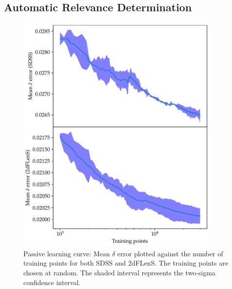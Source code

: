 \documentclass[11pt,twoside]{report}
\begin{document}
\subsection{Automatic Relevance Determination}
  \begin{figure}
    \centering
    \includegraphics[width=0.9\textwidth]{passive_delta.pdf}
    \caption{Passive learning curve: Mean $\delta$ error plotted against the number of training points for both SDSS and 2dFLenS. The training points are chosen at random. The shaded interval represents the two-sigma confidence interval.}
    \label{fig:passive_delta}
  \end{figure}
\end{document}

